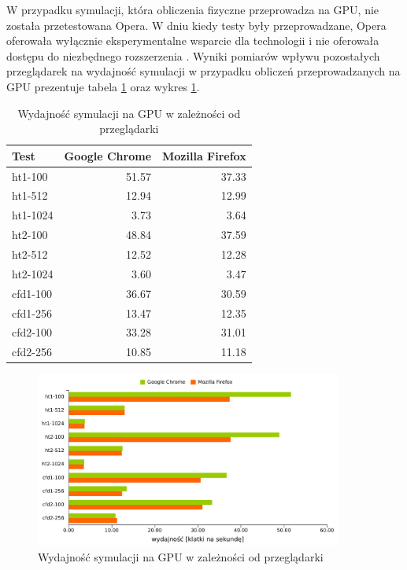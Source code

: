 W przypadku symulacji, która obliczenia fizyczne przeprowadza na GPU, nie
została przetestowana Opera.  W dniu kiedy testy były przeprowadzane, Opera
oferowała wyłącznie eksperymentalne wsparcie dla technologii  i nie
oferowała dostępu do niezbędnego rozszerzenia . Wyniki
pomiarów wpływu pozostałych przeglądarek na wydajność symulacji w przypadku
obliczeń przeprowadzanych na GPU prezentuje tabela \ref{tab:przegladarkiGPU}
oraz wykres \ref{fig:browserPerfGPU}.

\begin{table}[H]
\caption{Wydajność symulacji na GPU w zależności od przeglądarki}
\centering
\begin{tabular}{|l|r|r|}
\hline
Test & Google Chrome & Mozilla Firefox \\ \hline
ht1-100 & 51.57 & 37.33 \\ \hline
ht1-512 & 12.94 & 12.99 \\ \hline
ht1-1024 & 3.73 & 3.64 \\ \hline
ht2-100 & 48.84 & 37.59 \\ \hline
ht2-512 & 12.52 & 12.28 \\ \hline
ht2-1024 & 3.60 & 3.47 \\ \hline
\hline
cfd1-100 & 36.67 & 30.59 \\ \hline
cfd1-256 & 13.47 & 12.35 \\ \hline
cfd2-100 & 33.28 & 31.01 \\ \hline
cfd2-256 & 10.85 & 11.18 \\ \hline
\end{tabular}
\label{tab:przegladarkiGPU}
\end{table}

\begin{figure}[H]
\centering
\includegraphics[width=0.9\textwidth]{img/browserPerfGPU}
\caption{Wydajność symulacji na GPU w zależności od przeglądarki}
\label{fig:browserPerfGPU}
\end{figure}

